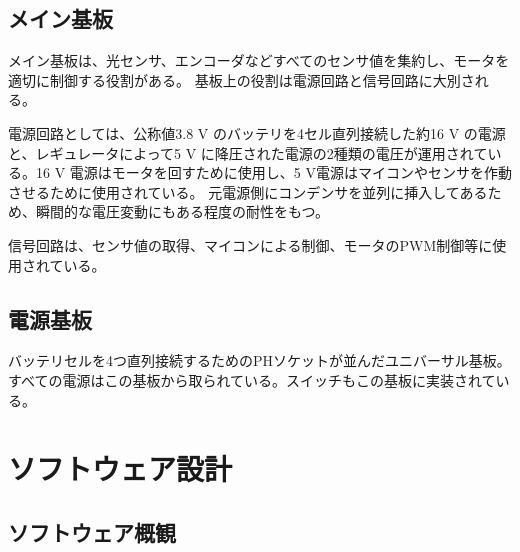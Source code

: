\documentclass{ltjsreport}
\begin{document}
\section{メイン基板}
メイン基板は、光センサ、エンコーダなどすべてのセンサ値を集約し、モータを適切に制御する役割がある。
基板上の役割は電源回路と信号回路に大別される。

電源回路としては、公称値3.8 V のバッテリを4セル直列接続した約16 V の電源と、レギュレータによって5 V に降圧された電源の2種類の電圧が運用されている。16 V 電源はモータを回すために使用し、5 V電源はマイコンやセンサを作動させるために使用されている。
元電源側にコンデンサを並列に挿入してあるため、瞬間的な電圧変動にもある程度の耐性をもつ。

信号回路は、センサ値の取得、マイコンによる制御、モータのPWM制御等に使用されている。



\section{電源基板}
バッテリセルを4つ直列接続するためのPHソケットが並んだユニバーサル基板。すべての電源はこの基板から取られている。スイッチもこの基板に実装されている。










\chapter{ソフトウェア設計}\label{cha:software}
\section{ソフトウェア概観}
\end{document}
